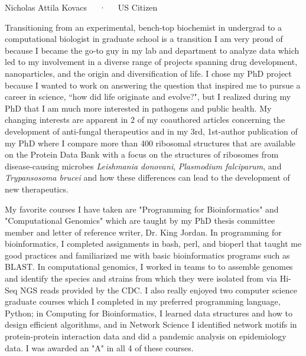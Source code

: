 \documentclass[11pt, letterpaper]{CV_latex_class}
\begin{document}
\makecvheader

\makecvfooter
  {Nicholas Attila Kovacs~~~·~~~US Citizen}

\makelettertitle

\begin{cvletter}


\hspace{1em} Transitioning from an experimental, bench-top biochemist in undergrad to a computational biologist in graduate school is a transition I am very proud of because I became the go-to guy in my lab and department to analyze data which led to my involvement in a diverse range of projects spanning drug development, nanoparticles, and the origin and diversification of life. I chose my PhD project because I wanted to work on answering the question that inspired me to pursue a career in science, ``how did life originate and evolve?", but I realized during my PhD that I am much more interested in pathogens and public health. My changing interests are apparent in 2 of my coauthored articles concerning the development of anti-fungal therapeutics and in my 3rd, 1st-author publication of my PhD where I compare more than 400 ribosomal structures that are available on the Protein Data Bank with a focus on the structures of ribosomes from disease-causing microbes \textit{Leishmania donovani}, \textit{Plasmodium falciparum}, and \textit{Trypansosoma brucei} and how these differences can lead to the development of new therapeutics.

\hspace{1em}My favorite courses I have taken are "Programming for Bioinformatics" and "Computational Genomics" which are taught by my PhD thesis committee member and letter of reference writer, Dr. King Jordan. In programming for bioinformatics, I completed assignments in bash, perl, and bioperl that taught me good practices and familiarized me with basic bioinformatics programs such as BLAST. In computational genomics, I worked in teams to to assemble genomes and identify the species and strains from which they were isolated from via Hi-Seq NGS reads provided by the CDC. I also really enjoyed two computer science graduate courses which I completed in my preferred programming language, Python; in Computing for Bioinformatics, I learned data structures and how to design efficient algorithms, and in Network Science I identified network motifs in protein-protein interaction data and did a pandemic analysis on epidemiology data. I was awarded an "A" in all 4 of these courses.  


\end{cvletter}
\end{document}
